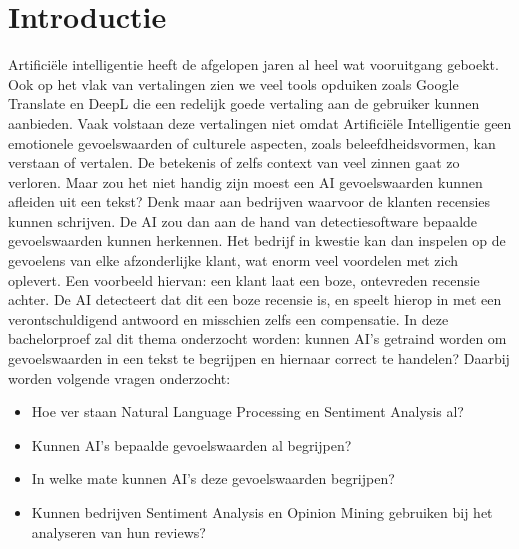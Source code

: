 
\section{Introductie} %
\label{sec:introductie}

Artificiële intelligentie heeft de afgelopen jaren al heel wat vooruitgang geboekt. Ook op het vlak van vertalingen zien we veel tools opduiken zoals Google Translate en DeepL die een redelijk goede vertaling aan de gebruiker kunnen aanbieden. Vaak volstaan deze vertalingen niet omdat Artificiële Intelligentie geen emotionele gevoelswaarden of culturele aspecten, zoals beleefdheidsvormen, kan verstaan of vertalen. De betekenis of zelfs context van veel zinnen gaat zo verloren. Maar zou het niet handig zijn moest een AI gevoelswaarden kunnen afleiden uit een tekst? Denk maar aan bedrijven waarvoor de klanten recensies kunnen schrijven. De AI zou dan aan de hand van detectiesoftware bepaalde gevoelswaarden kunnen herkennen. Het bedrijf in kwestie kan dan inspelen op de gevoelens van elke afzonderlijke klant, wat enorm veel voordelen met zich oplevert.
Een voorbeeld hiervan: een klant laat een boze, ontevreden recensie achter. De AI detecteert dat dit een boze recensie is, en speelt hierop in met een verontschuldigend antwoord en misschien zelfs een compensatie.  
In deze bachelorproef zal dit thema onderzocht worden: kunnen AI’s getraind worden om gevoelswaarden in een tekst te begrijpen en hiernaar correct te handelen? Daarbij worden volgende vragen onderzocht:

\begin{itemize}
  \item Hoe ver staan Natural Language Processing en Sentiment Analysis al?
  \item Kunnen AI's bepaalde gevoelswaarden al begrijpen?
  \item In welke mate kunnen AI's deze gevoelswaarden begrijpen?
  \item Kunnen bedrijven Sentiment Analysis en Opinion Mining gebruiken bij het analyseren van hun reviews?
\end{itemize}


